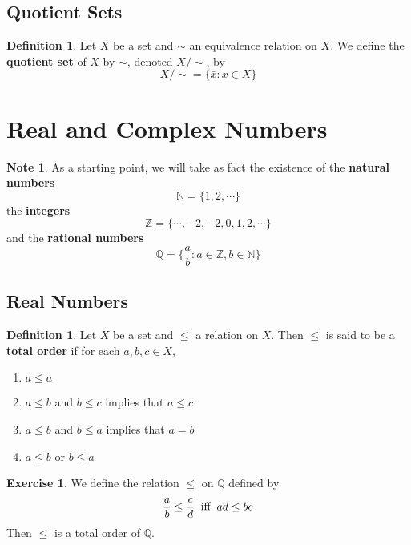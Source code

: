 \documentclass[12pt]{amsart}
\theoremstyle{definition}
\newtheorem{defn}[definition]{Definition}
\newtheorem{note}[definition]{Note}
\newtheorem{ex}[definition]{Exercise}
\newcommand{\N}{\mathbb{N}}
\newcommand{\Z}{\mathbb{Z}}
\newcommand{\Q}{\mathbb{Q}}
\newcommand{\lex}[1]{\label{ex:#1}}
\newcommand{\ld}[1]{\label{defn:#1}}
\begin{document}
	
	
	
	
	
	
	
	\newpage
	\subsection{Quotient Sets}
	\begin{defn}
	Let $X$ be a set and $\sim$ an equivalence relation on $X$. We define the \textbf{quotient set} of $X$ by $\sim$, denoted $X/ {\sim}$, by 
	\begin{equation*}
	X/ {\sim} = \{\bar{x}: x \in X\}
	\end{equation*}
	\end{defn}
	
	
	\section{Real and Complex Numbers}
	\begin{note}
		As a starting point, we will take as fact the existence of the \textbf{natural numbers} $$\N = \{1, 2, \cdots\}$$ the \textbf{integers} $$\Z = \{\cdots, -2, -2, 0, 1, 2, \cdots\}$$ and the \textbf{rational numbers} $$\Q = \bigg \{\frac{a}{b}: a \in \Z, b \in \N \bigg \}$$
	\end{note}
	\subsection{Real Numbers}
	
	\begin{defn} \ld{}
		Let $X$ be a set and $\leq$ a relation on $X$. Then $\leq$ is said to be a \textbf{total order} if for each $a,b,c \in X$,
		\begin{enumerate}
			\item $a \leq a$
			\item $a \leq b$ and $b \leq c$ implies that $a \leq  c$ 
			\item $a \leq b$ and $b \leq a$ implies that $a = b$ 
			\item $a \leq b$ or $b \leq a$
		\end{enumerate}
	\end{defn}

	\begin{ex} \lex{}
		We define the relation $\leq$ on $\Q$ defined by $$\frac{a}{b} \leq \frac{c}{d} \hspace{.2cm} \text{iff} \hspace{.2cm} ad \leq bc$$ Then $\leq$ is a total order of $\Q$.
	\end{ex}
\end{document}

